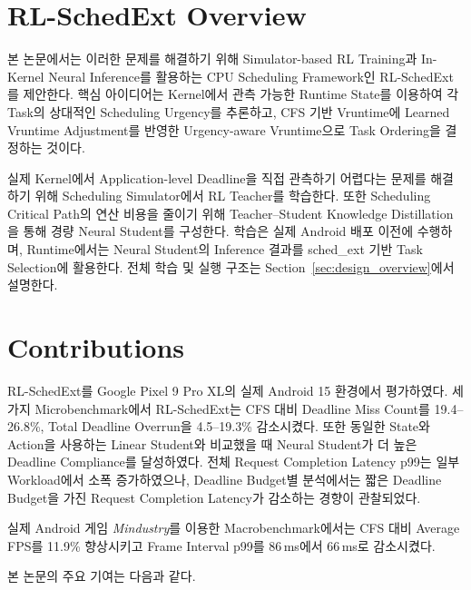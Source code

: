 \section{RL-SchedExt Overview}
\label{sec:intro-rl-schedext-overview}

본 논문에서는 이러한 문제를 해결하기 위해 Simulator-based RL Training과 In-Kernel Neural Inference를 활용하는 CPU Scheduling Framework인 RL-SchedExt를 제안한다.
핵심 아이디어는 Kernel에서 관측 가능한 Runtime State를 이용하여 각 Task의 상대적인 Scheduling Urgency를 추론하고, CFS 기반 Vruntime에 Learned Vruntime Adjustment를 반영한 Urgency-aware Vruntime으로 Task Ordering을 결정하는 것이다.

실제 Kernel에서 Application-level Deadline을 직접 관측하기 어렵다는 문제를 해결하기 위해 Scheduling Simulator에서 RL Teacher를 학습한다.
또한 Scheduling Critical Path의 연산 비용을 줄이기 위해 Teacher--Student Knowledge Distillation을 통해 경량 Neural Student를 구성한다.
학습은 실제 Android 배포 이전에 수행하며, Runtime에서는 Neural Student의 Inference 결과를 sched\_ext 기반 Task Selection에 활용한다.
전체 학습 및 실행 구조는 Section~\ref{sec:design_overview}에서 설명한다.

\section{Contributions}
\label{sec:intro-contributions}

RL-SchedExt를 Google Pixel 9 Pro XL의 실제 Android 15 환경에서 평가하였다.
세 가지 Microbenchmark에서 RL-SchedExt는 CFS 대비 Deadline Miss Count를 19.4--26.8\%, Total Deadline Overrun을 4.5--19.3\% 감소시켰다. 또한 동일한 State와 Action을 사용하는 Linear Student와 비교했을 때 Neural Student가 더 높은 Deadline Compliance를 달성하였다.
전체 Request Completion Latency p99는 일부 Workload에서 소폭 증가하였으나, Deadline Budget별 분석에서는 짧은 Deadline Budget을 가진 Request Completion Latency가 감소하는 경향이 관찰되었다.

실제 Android 게임 \textit{Mindustry}를 이용한 Macrobenchmark에서는 CFS 대비 Average FPS를 11.9\% 향상시키고 Frame Interval p99를 86\,ms에서 66\,ms로 감소시켰다.

본 논문의 주요 기여는 다음과 같다.

